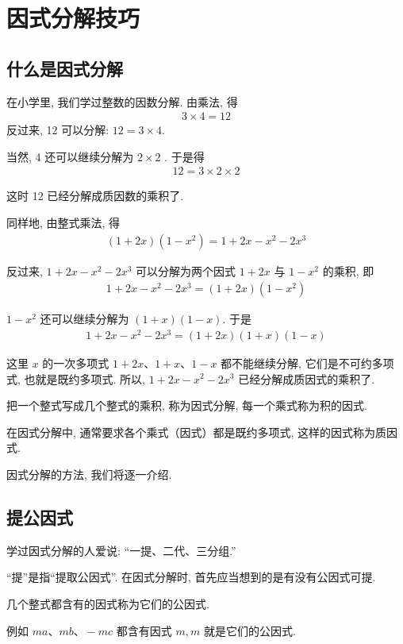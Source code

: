 \chapter{因式分解技巧}
\section*{什么是因式分解}
在小学里, 我们学过整数的因数分解. 由乘法, 得
\begin{align*}
	3 \times 4=12
\end{align*}
反过来, 12 可以分解: $12=3 \times 4$.

当然,  4 还可以继续分解为 $2 \times 2$ . 于是得
\begin{align*}
	12=3 \times 2 \times 2
\end{align*}

这时 12 已经分解成质因数的乘积了.

同样地, 由整式乘法, 得
\begin{align*}
	(1+2 x)\left(1-x^{2}\right)=1+2 x-x^{2}-2 x^{3}
\end{align*}

反过来,  $1+2 x-x^{2}-2 x^{3}$ 可以分解为两个因式 $1+2 x$ 与 $1-x^{2}$ 的乘积, 即
\begin{align*}
	1+2 x-x^{2}-2 x^{3}=(1+2 x)\left(1-x^{2}\right)
\end{align*}

$1-x^{2}$ 还可以继续分解为 $(1+x)(1-x)$. 于是
\begin{align*}
	1+2 x-x^{2}-2 x^{3}=(1+2 x)(1+x)(1-x)
\end{align*}

这里 $x$ 的一次多项式 $1+2 x 、 1+x 、 1-x$ 都不能继续分解, 它们是不可约多项式, 也就是既约多项式.  所以,  $1+2 x-x^{2}-2 x^{3}$ 已经分解成质因式的乘积了.

把一个整式写成几个整式的乘积, 称为因式分解, 每一个乘式称为积的因式.

在因式分解中, 通常要求各个乘式（因式）都是既约多项式, 这样的因式称为质因式.

因式分解的方法, 我们将逐一介绍.

\section{提公因式}
学过因式分解的人爱说: “一提、二代、三分组.”

“提”是指“提取公因式”. 在因式分解时, 首先应当想到的是有没有公因式可提.

几个整式都含有的因式称为它们的公因式.

例如 $m a 、 m b 、-m c$ 都含有因式 $m, m$ 就是它们的公因式.

